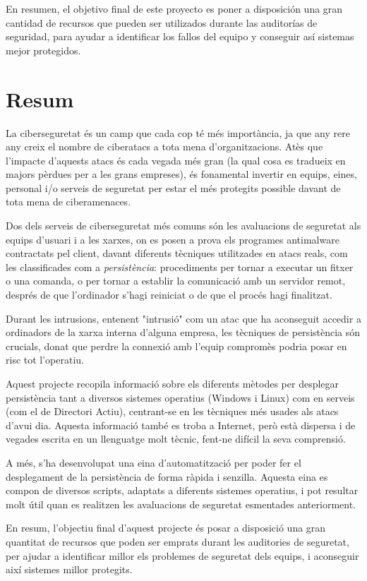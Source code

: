 En resumen, el objetivo final de este proyecto es poner a disposición una gran cantidad de recursos que pueden ser utilizados durante las auditorías de seguridad, para ayudar a identificar los fallos del equipo y conseguir así sistemas mejor protegidos.

\pagebreak
\section*{Resum} 

La ciberseguretat és un camp que cada cop té més importància, ja que any rere any creix el nombre de ciberatacs a tota mena d'organitzacions. 
Atès que l'impacte d'aquests atacs és cada vegada més gran (la qual cosa es tradueix en majors pèrdues per a les grans empreses), és fonamental invertir en equips, eines, personal i/o serveis de seguretat per estar el més protegits possible davant de tota mena de ciberamenaces.

Dos dels serveis de ciberseguretat més comuns són les avaluacions de seguretat als equips d'usuari i a les xarxes, on es posen a prova els programes antimalware contractats pel client, davant diferents tècniques utilitzades en atacs reals, com les classificades com a \textit{persistència}: procediments per tornar a executar un fitxer o una comanda, o per tornar a establir la comunicació amb un servidor remot, després de que l'ordinador s'hagi reiniciat o de que el procés hagi finalitzat.

Durant les intrusions, entenent "intrusió" com un atac que ha aconseguit accedir a ordinadors de la xarxa interna d'alguna empresa, les tècniques de persistència són crucials, donat que perdre la connexió amb l'equip compromès podria posar en risc tot l'operatiu.

Aquest projecte recopila informació sobre els diferents mètodes per desplegar persistència tant a diversos sistemes operatius (Windows i Linux) com en serveis (com el de Directori Actiu), centrant-se en les tècniques més usades als atacs d'avui dia. Aquesta informació també es troba a Internet, però està dispersa i de vegades escrita en un llenguatge molt tècnic, fent-ne difícil la seva comprensió.

A més, s'ha desenvolupat una eina d'automatització per poder fer el desplegament de la persistència de forma ràpida i senzilla. Aquesta eina es compon de diversos scripts, adaptats a diferents sistemes operatius, i pot resultar molt útil quan es realitzen les avaluacions de seguretat esmentades anteriorment.

En resum, l'objectiu final d'aquest projecte és posar a disposició una gran quantitat de recursos que poden ser emprats durant les auditories de seguretat, per ajudar a identificar millor els problemes de seguretat dels equips, i aconseguir així sistemes millor protegits.

